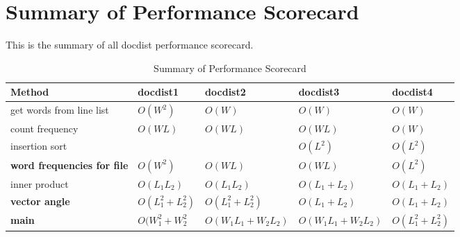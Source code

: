 \documentclass{article}
\begin{document}
    \section{Summary of Performance Scorecard}
    This is the summary of all docdist performance scorecard. 
    \begin{table}[h]
        \centering
        \caption{Summary of Performance Scorecard}
        \begin{tabular}{|p{3cm}|l|l|l|l|} 
        \hline
        Method                                & docdist1           & docdist2             & docdist3                                                         & docdist4            \\ 
        \hline
        get words from line list          & $O(W^2)$           & $O(W)$               & $O(W)$                                                           & $O(W)$              \\ 
        \hline
        count frequency                      & $O(W L)$           & $O(W L)$             & $O(W L)$                                                         & $O(W)$              \\ 
        \hline
                                             insertion sort &                    &                      & $O(L^2)$                                                         & $O(L^2)$            \\ 
        \hline
        \textbf{word frequencies for file} & $O(W^2)$           & $O(W L)$             & $O(W L)$                                                         & $O(L^2)$            \\ 
        \hline
        inner product                        & $O(L_1 L_2)$       & $O(L_1 L_2)$         & $O(L_1 + L_2)$                                                   & $O(L_1 + L_2)$      \\ 
        \hline
        \textbf{vector angle}                & $O(L_1^2 + L_2^2)$ & $O(L_1^2 + L_2^2)$   & $O(L_1 + L_2)$                                                   & $O(L_1 + L_2)$      \\ 
        \hline
        \textbf{main}                         & $O(W_1^2 + W_2^2$  & $O(W_1 L_1 + W_2L_2)$ & $O(W_1 L_1 + W_2 L_2)$ & $O(L_1^2 + L_2^2)$  \\
        \hline
        \end{tabular}
    \end{table}
\end{document}

